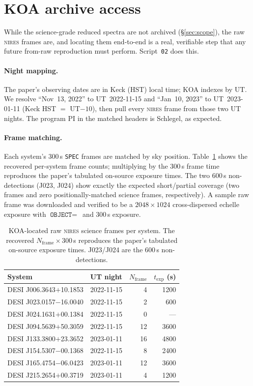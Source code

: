 \documentclass[11pt,letterpaper]{article}
\newcommand{\NIRES}{\textsc{nires}}
\begin{document}
\section{KOA archive access}

While the science-grade reduced spectra are not archived
(\S\ref{sec:scope}), the raw \NIRES{} frames are, and locating them
end-to-end is a real, verifiable step that any future from-raw
reproduction must perform. Script~\texttt{02} does this.

\paragraph{Night mapping.} The paper's observing dates are in Keck (HST)
local time; KOA indexes by UT. We resolve ``Nov~13, 2022'' to
UT~2022-11-15 and ``Jan~10, 2023'' to UT~2023-01-11 (Keck HST $=$
UT$-10$), then pull every \NIRES{} frame from those two UT nights. The
program PI in the matched headers is Schlegel, as expected.

\paragraph{Frame matching.} Each system's 300\,s \texttt{SPEC} frames are
matched by sky position. Table~\ref{tab:koa} shows the recovered per-system
frame counts; multiplying by the 300\,s frame time reproduces the paper's
tabulated on-source exposure times. The two 600\,s non-detections (J023,
J024) show exactly the expected short/partial coverage (two frames and
zero positionally-matched science frames, respectively). A sample raw
frame was downloaded and verified to be a $2048\times1024$
cross-dispersed echelle exposure with $\texttt{OBJECT}=$\,
and $300$\,s exposure.

\begin{table}[ht]
\centering
\caption{KOA-located raw \NIRES{} science frames per system. The recovered
$N_{\mathrm{frame}}\times300$\,s reproduces the paper's tabulated
on-source exposure times. J023/J024 are the 600\,s non-detections.}
\label{tab:koa}
\begin{tabular}{llrr}
\toprule
System & UT night & $N_{\mathrm{frame}}$ & $t_{\mathrm{exp}}$ (s) \\
\midrule
DESI J006.3643$+$10.1853 & 2022-11-15 & 4  & 1200 \\
DESI J023.0157$-$16.0040 & 2022-11-15 & 2  & 600 \\
DESI J024.1631$+$00.1384 & 2022-11-15 & 0  & --- \\
DESI J094.5639$+$50.3059 & 2022-11-15 & 12 & 3600 \\
DESI J133.3800$+$23.3652 & 2023-01-11 & 16 & 4800 \\
DESI J154.5307$-$00.1368 & 2022-11-15 & 8  & 2400 \\
DESI J165.4754$-$06.0423 & 2023-01-11 & 12 & 3600 \\
DESI J215.2654$+$00.3719 & 2023-01-11 & 4  & 1200 \\
\bottomrule
\end{tabular}
\end{table}
\end{document}
